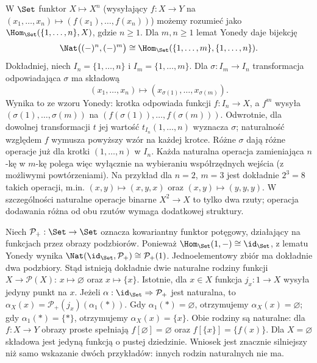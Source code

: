 \begin{przyklad}\label{przyklad:yoneda-tuple}
W $\Set$ funktor $X\mapsto X^n$ (wysyłający $f:X\to Y$ na $(x_1,\ldots,x_n)\mapsto(f(x_1),\ldots,f(x_n))$) możemy rozumieć jako $\Hom_{\Set}(\{1,\ldots,n\},X)$, gdzie $n\geq1$. Dla $m,n\geq1$ lemat Yonedy daje bijekcję
\[
\Nat\bigl((- )^n,(- )^m\bigr)\cong\Hom_{\Set}(\{1,\ldots,m\},\{1,\ldots,n\}).
\]
Dokładniej, niech $I_n=\{1,\ldots,n\}$ i $I_m=\{1,\ldots,m\}$. Dla $\sigma:I_m\to I_n$ transformacja odpowiadająca $\sigma$ ma składową
\[
(x_1,\ldots,x_n)\longmapsto
(x_{\sigma(1)},\ldots,x_{\sigma(m)}).
\]
Wynika to ze wzoru Yonedy: krotka odpowiada funkcji $f:I_n\to X$, a $f^m$ wysyła $(\sigma(1),\ldots,\sigma(m))$ na $(f(\sigma(1)),\ldots,f(\sigma(m)))$. Odwrotnie, dla dowolnej transformacji $t$ jej wartość $t_{I_n}(1,\ldots,n)$ wyznacza $\sigma$; naturalność względem $f$ wymusza powyższy wzór na każdej krotce. Różne $\sigma$ dają różne operacje już dla krotki $(1,\ldots,n)$ w $I_n$. Każda naturalna operacja zamieniająca $n$-kę w $m$-kę polega więc wyłącznie na wybieraniu współrzędnych wejścia (z możliwymi powtórzeniami). Na przykład dla $n=2$, $m=3$ jest dokładnie $2^3=8$ takich operacji, m.in. $(x,y)\mapsto(x,y,x)$ oraz $(x,y)\mapsto(y,y,y)$. W szczególności naturalne operacje binarne $X^2\to X$ to tylko dwa rzuty; operacja dodawania różna od obu rzutów wymaga dodatkowej struktury.
\end{przyklad}

\begin{przyklad}
Niech $\mathcal P_+:\Set\to\Set$ oznacza kowariantny funktor potęgowy, działający na funkcjach przez obrazy podzbiorów. Ponieważ $\Hom_{\Set}(1,-)\cong\id_{\Set}$, z lematu Yonedy wynika
$\Nat(\id_{\Set},\mathcal P_+)\cong\mathcal P_+(1)$. Jednoelementowy zbiór ma dokładnie dwa podzbiory. Stąd istnieją dokładnie dwie naturalne rodziny funkcji $X\to\mathcal P(X)$: $x\mapsto\varnothing$ oraz $x\mapsto\{x\}$. Istotnie, dla $x\in X$ funkcja $j_x:1\to X$ wysyła jedyny punkt na $x$. Jeżeli $\alpha:\id_{\Set}\Rightarrow\mathcal P_+$ jest naturalna, to $\alpha_X(x)=\mathcal P_+(j_x)(\alpha_1(*))$. Gdy $\alpha_1(*)=\varnothing$, otrzymujemy $\alpha_X(x)=\varnothing$; gdy $\alpha_1(*)=\{*\}$, otrzymujemy $\alpha_X(x)=\{x\}$. Obie rodziny są naturalne: dla $f:X\to Y$ obrazy proste spełniają $f[\varnothing]=\varnothing$ oraz $f[\{x\}]=\{f(x)\}$. Dla $X=\varnothing$ składowa jest jedyną funkcją o pustej dziedzinie. Wniosek jest znacznie silniejszy niż samo wskazanie dwóch przykładów: innych rodzin naturalnych nie ma.
\end{przyklad}

